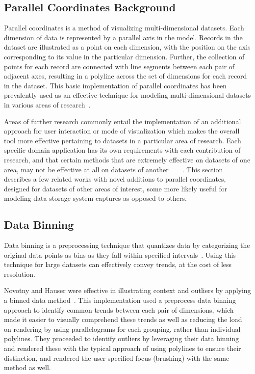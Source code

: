 \documentclass[journal]{vgtc}                %
\begin{document}
\subsection{Parallel Coordinates Background}
\label{background}

Parallel coordinates is a method of visualizing multi-dimensional datasets. Each dimension of data is represented by a parallel axis in the model. Records in the dataset are illustrated as a point on each dimension, with the position on the axis corresponding to its value in the particular dimension. Further, the collection of points for each record are connected with line segments between each pair of adjacent axes, resulting in a polyline across the set of dimensions for each record in the dataset. This basic implementation of parallel coordinates has been prevalently used as an effective technique for modeling multi-dimensional datasets in various areas of research~\cite{Inselberg:1990:PCT:949531.949588}.

Areas of further research commonly entail the implementation of an additional approach for user interaction or mode of visualization which makes the overall tool more effective pertaining to datasets in a particular area of research. Each specific domain application has its own requirements with each contribution of research, and that certain methods that are extremely effective on datasets of one area, may not be effective at all on datasets of another~\cite{novotny:2006:OPFC}~\cite{johansson:2007:DCDTPC}~\cite{peng:2005:CRMD}~\cite{Graham:2003:UCE}. This section describes a few related works with novel additions to parallel coordinates, designed for datasets of other areas of interest, some more likely useful for modeling data storage system captures as opposed to others.

\subsection{Data Binning}
\label{data_binning}
Data binning is a preprocessing technique that quantizes data by categorizing the original data points as bins as they fall within specified intervals~\cite{website:binning}. Using this technique for large datasets can effectively convey trends, at the cost of less resolution.

Novotny and Hauser were effective in illustrating context and outliers by applying a binned data method~\cite{novotny:2006:OPFC}. This implementation used a preprocess data binning approach to identify common trends between each pair of dimensions, which made it easier to visually comprehend these trends as well as reducing the load on rendering by using parallelograms for each grouping, rather than individual polylines. They proceeded to identify outliers by leveraging their data binning and rendered these with the typical approach of using polylines to ensure their distinction, and rendered the user specified focus (brushing) with the same method as well.
\end{document}
